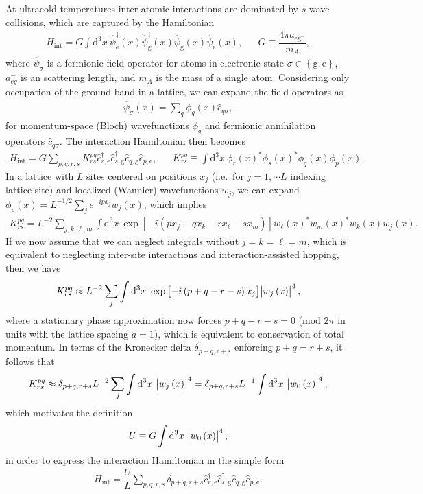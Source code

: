 \documentclass[aps,notitlepage,nofootinbib,11pt]{revtex4-1}
\renewcommand{\t}{\text} %
\newcommand{\f}[2]{\dfrac{#1}{#2}} %
\newcommand{\p}[1]{\left(#1\right)} %
\renewcommand{\sp}[1]{\left[#1\right]} %
\renewcommand{\set}[1]{\left\{#1\right\}} %
\renewcommand{\d}{\text{d}} %
\newcommand{\g}{\text{g}} %
\newcommand{\e}{\text{e}}
\newcommand{\1}{\mathds{1}}
\begin{document}
At ultracold temperatures inter-atomic interactions are dominated by
$s$-wave collisions, which are captured by the Hamiltonian
\begin{align}
  H_{\t{int}} = G \int \d^3x~
  \hat\psi_\e^\dag\p{x} \hat\psi_\g^\dag\p{x}
  \hat\psi_\g\p{x} \hat\psi_\e\p{x},
  &&
  G \equiv \f{4\pi a_{\e\g^-}}{m_A},
  \label{eq:H_int_full}
\end{align}
where $\hat\psi_\sigma$ is a fermionic field operator for atoms in
electronic state $\sigma\in\set{\g,\e}$, $a_{eg}^-$ is an scattering
length, and $m_A$ is the mass of a single atom.  Considering only
occupation of the ground band in a lattice, we can expand the field
operators as
\begin{align}
  \hat\psi_\sigma\p{x} = \sum_q \phi_q\p{x} \hat c_{q\sigma},
\end{align}
for momentum-space (Bloch) wavefunctions $\phi_q$ and fermionic
annihilation operators $\hat c_{q\sigma}$.  The interaction
Hamiltonian then becomes
\begin{align}
  H_{\t{int}} = G \sum_{p,q,r,s} K^{pq}_{rs}
  \hat c_{r,\e}^\dag \hat c_{s,\g}^\dag \hat c_{q,\g} \hat c_{p,\e},
  &&
  K^{pq}_{rs} \equiv \int \d^3x~
  \phi_r\p{x}^* \phi_s\p{x}^* \phi_q\p{x} \phi_p\p{x}.
\end{align}
In a lattice with $L$ sites centered on positions $x_j$ (i.e.~for
$j=1,\cdots L$ indexing lattice site) and localized (Wannier)
wavefunctions $w_j$, we can expand
$\phi_p\p{x}=L^{-1/2}\sum_je^{-ipx_j}w_j\p{x}$, which implies
\begin{align}
  K^{pq}_{rs} = L^{-2} \sum_{j,k,\ell,m} \int \d^3x~
  \exp\sp{-i\p{px_j+qx_k-rx_\ell-sx_m}}
  w_\ell\p{x}^* w_m\p{x}^* w_k\p{x} w_j\p{x}.
\end{align}
If we now assume that we can neglect integrals without $j=k=\ell=m$,
which is equivalent to neglecting inter-site interactions and
interaction-assisted hopping, then we have
\begin{align}
  K^{pq}_{rs} \approx L^{-2} \sum_j \int \d^3x~
  \exp\sp{-i\p{p+q-r-s}x_j} \abs{w_j\p{x}}^4,
\end{align}
where a stationary phase approximation now forces $p+q-r-s=0$ (mod
$2\pi$ in units with the lattice spacing $a=1$), which is equivalent
to conservation of total momentum.  In terms of the Kronecker delta
$\delta_{p+q,r+s}$ enforcing $p+q=r+s$, it follows that
\begin{align}
  K^{pq}_{rs} \approx \delta_{p+q,r+s} L^{-2}
  \sum_j \int \d^3x~ \abs{w_j\p{x}}^4
  = \delta_{p+q,r+s} L^{-1} \int \d^3x~ \abs{w_0\p{x}}^4,
\end{align}
which motivates the definition
\begin{align}
  U \equiv G \int \d^3x~ \abs{w_0\p{x}}^4,
\end{align}
in order to express the interaction Hamiltonian in the simple form
\begin{align}
  H_{\t{int}} = \f{U}{L} \sum_{p,q,r,s}
  \delta_{p+q,r+s} \hat c_{r,\e}^\dag \hat c_{s,\g}^\dag
  \hat c_{q,\g} \hat c_{p,\e}.
  \label{eq:H_int_uniform}
\end{align}
\end{document}
